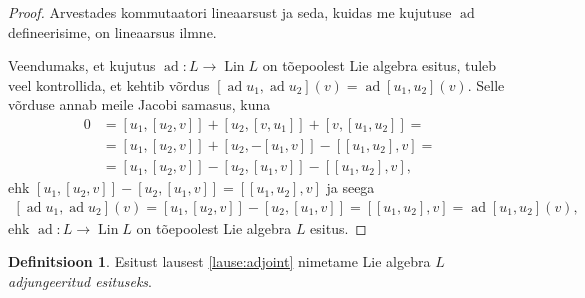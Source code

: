 \documentclass[12pt,a4paper,oneside]{article}
\theoremstyle{plain}
\theoremstyle{definition}
\newtheorem{definitsioon}{Definitsioon}[section]
\numberwithin{equation}{section}
\DeclareMathOperator{\ad}{ad}
\DeclareMathOperator{\Lin}{Lin}
\begin{document}
\begin{proof}
Arvestades kommutaatori lineaarsust ja seda, kuidas me kujutuse 
$\ad$ defineerisime, on lineaarsus ilmne.

Veendumaks, et kujutus $\ad : L \rightarrow \Lin L$ on tõepoolest 
Lie algebra esitus, tuleb veel kontrollida, et kehtib võrdus 
$\left[\ad u_1, \ad u_2 \right] \left(v\right) = 
\ad \left[u_1, u_2 \right] \left(v\right)$. Selle võrduse 
annab meile Jacobi samasus, kuna
\begin{align*}
0 &= \left[ u_1, \left[u_2, v\right] \right] + \left[ u_2, 
	\left[v, u_1 \right] \right] + 
	\left[ v, \left[u_1, u_2\right] \right] = \\
&= \left[ u_1, \left[u_2, v\right] \right] + 
	\left[ u_2, -\left[u_1, v \right] \right] - 
	\left[\left[u_1, u_2\right], v\right] = \\
&= \left[ u_1, \left[u_2, v\right] \right] - 
	\left[ u_2, \left[u_1, v \right] \right] - 
	\left[\left[u_1, u_2\right], v\right],
\end{align*}
ehk $\left[ u_1, \left[u_2, v\right] \right] - 
	\left[ u_2, \left[u_1, v \right] \right] = 
	\left[\left[u_1, u_2\right], v\right]$ ja seega
\begin{align*}
\left[\ad u_1, \ad u_2 \right] \left(v\right) = 
	\left[u_1, \left[u_2, v\right]\right ] - 
	\left[u_2, \left[u_1, v\right]\right] = 
	\left[\left[u_1, u_2\right], v\right] = 
	\ad \left[u_1, u_2 \right] \left(v\right),
\end{align*}
ehk $\ad : L \rightarrow \Lin L$ on tõepoolest Lie algebra $L$ 
esitus.
\end{proof}

\begin{definitsioon}
Esitust lausest \ref{lause:adjoint} nimetame Lie algebra $L$ 
\emph{adjungeeritud esituseks}.
\end{definitsioon}
\end{document}
